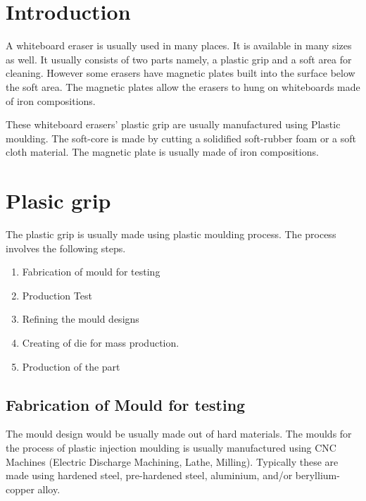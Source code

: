 \documentclass[12pt,a4paper,oneside]{article}
\begin{document}

\newpage
\tableofcontents

\listoffigures
\newpage
{}
\setcounter{page}{1}

\section{Introduction}

A whiteboard eraser is usually used in many places. It is available in many sizes as well. It usually consists of two parts namely, a plastic grip and a soft area for cleaning. However some erasers have magnetic plates built into the surface below the soft area. The magnetic plates allow the erasers to hung on whiteboards made of iron compositions. 

These whiteboard erasers’ plastic grip are usually manufactured using Plastic moulding. The soft-core is made by cutting a solidified soft-rubber foam or a soft cloth material. The magnetic plate is usually made of iron compositions. 



\newpage
\section{Plasic grip}

The plastic grip is usually made using plastic moulding process. The process involves the following steps. 

\begin{enumerate}
    \item Fabrication of mould for testing
    \item Production Test
    \item Refining the mould designs
    \item Creating of die for mass production.
    \item Production of the part
\end{enumerate}


\subsection{Fabrication of Mould for testing}

The mould design would be usually made out of hard materials. The moulds for the process of plastic injection moulding is usually manufactured using CNC Machines (Electric Discharge Machining, Lathe, Milling). Typically these are made using hardened steel, pre-hardened steel, aluminium, and/or beryllium-copper alloy.
\end{document}
